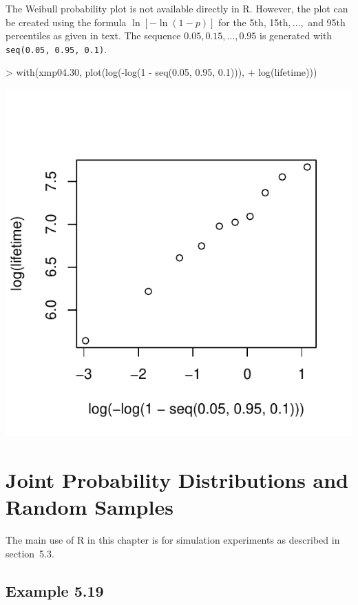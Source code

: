 \documentclass{book}
\begin{document}
The Weibull probability plot is not available directly in R.  However,
the plot can be created using the formula $\ln[-\ln(1-p)]$ for the
5th, 15th$,\dots,$ and 95th percentiles as given in text.  The
sequence $0.05,0.15,\dots,0.95$ is generated with
\texttt{seq(0.05, 0.95, 0.1)}.
\begin{Schunk}
\begin{Sinput}
> with(xmp04.30, plot(log(-log(1 - seq(0.05, 0.95, 0.1))), 
+     log(lifetime)))
\end{Sinput}
\end{Schunk}
\includegraphics{Devore6-xmp0430}


\chapter[Joint Probability Distributions]{Joint Probability
  Distributions and Random Samples}
\label{cha:Joint}

The main use of R in this chapter is for simulation experiments as
described in section~5.3.

\section{Example 5.19}
\label{sec:xmp0519}
\end{document}
